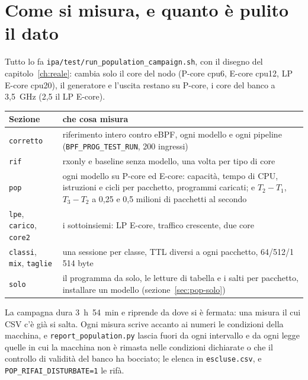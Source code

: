 \documentclass[11pt,a4paper,oneside]{report}
\begin{document}
\section{Come si misura, e quanto è pulito il dato}

Tutto lo fa \texttt{ipa/test/run\_population\_campaign.sh}, con il disegno del
capitolo~\ref{ch:reale}: cambia solo il core del nodo (P-core cpu6,
E-core cpu12, LP E-core cpu20), il generatore e l'uscita restano su P-core, i
core del banco a 3,5~GHz (2,5 il LP E-core).

\begin{center}
\small
\begin{tabular}{@{}lp{10cm}@{}}
\toprule
\textbf{Sezione} & \textbf{che cosa misura} \\
\midrule
\texttt{corretto} & riferimento intero contro eBPF, ogni modello e ogni pipeline
                    (\texttt{BPF\_PROG\_TEST\_RUN}, 200 ingressi) \\
\texttt{rif}      & rxonly e baseline senza modello, una volta per tipo di core \\
\texttt{pop}      & ogni modello su P-core ed E-core: capacità, tempo di CPU,
                    istruzioni e cicli per pacchetto, programmi caricati; e
                    $T_2-T_1$, $T_3-T_2$ a 0,25 e 0,5 milioni di pacchetti al secondo \\
\texttt{lpe}, \texttt{carico}, \texttt{core2} & i sottoinsiemi: LP E-core, traffico
                    crescente, due core \\
\texttt{classi}, \texttt{mix}, \texttt{taglie} & una sessione per classe, TTL diversi
                    a ogni pacchetto, 64/512/1\,514 byte \\
\texttt{solo}     & il programma da solo, le letture di tabella e i salti per
                    pacchetto, installare un modello (sezione~\ref{sec:pop-solo}) \\
\bottomrule
\end{tabular}
\end{center}

La campagna dura 3~h~54~min e riprende da dove si è fermata: una misura il cui
CSV c'è già si salta. Ogni misura scrive accanto ai numeri le condizioni della
macchina, e \texttt{report\_population.py} lascia fuori da ogni intervallo e da
ogni legge quelle in cui la macchina non è rimasta nelle condizioni dichiarate
o che il controllo di validità del banco ha bocciato; le elenca in
\texttt{escluse.csv}, e \texttt{POP\_RIFAI\_DISTURBATE=1} le rifà.
\end{document}
